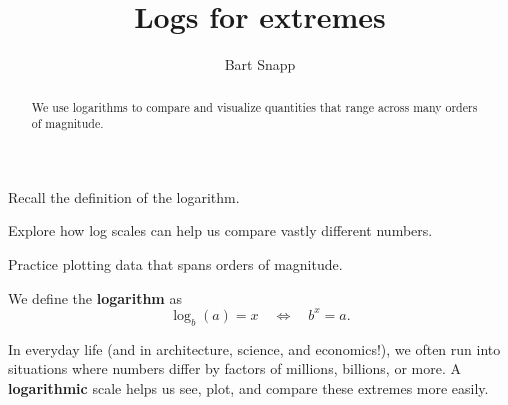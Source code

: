 \documentclass[noauthor,nooutcomes,handout,hints,12pt]{ximera}
\author{Bart Snapp}
\title{Logs for extremes}
\begin{document}
\begin{abstract}
    We use logarithms to compare and visualize quantities that range
    across many orders of magnitude.
\end{abstract}
\maketitle

\begin{listOutcomes}
    \item Recall the definition of the logarithm.
    \item Explore how log scales can help us compare vastly different numbers.
    \item Practice plotting data that spans orders of magnitude.
\end{listOutcomes}

\begin{definition}
    We define the \textbf{logarithm} as
    \[
        \log_b(a) = x
        \quad\Leftrightarrow\quad
        b^x = a.
    \]
\end{definition}

In everyday life (and in architecture, science, and economics!), we
often run into situations where numbers differ by factors of millions,
billions, or more. A \textbf{logarithmic} scale helps us see, plot,
and compare these extremes more easily.

\mynewpage
\end{document}
